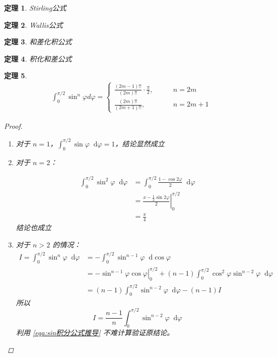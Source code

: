 \documentclass{ctexart}
\numberwithin{equation}{section}    %
\newcommand*{\dif}{\mathop{}\!\mathrm{d}}
\newtheorem{theorem}{定理}
\begin{document}
\begin{theorem}{Stirling公式}
    
\end{theorem}
\begin{theorem}{Wallis公式}
    
\end{theorem}
\begin{theorem}{和差化积公式}
    
\end{theorem}
\begin{theorem}{积化和差公式}
    
\end{theorem}
\begin{theorem}
    \begin{equation}
        \label{eqa:sin积分公式}
        \begin{aligned}
        \int_0^{\pi/2}\sin^n\varphi d\varphi=\left\{ \begin{aligned}
            \frac{(2m-1)!!}{(2m)!!}\cdot\frac{\pi}{2},\qquad&n=2m\\
            \frac{(2m)!!}{(2m+1)!!},\qquad\phantom{\cdot\frac{\pi}{2}}&n=2m+1\end{aligned}\right.
        \end{aligned}
    \end{equation}
\begin{proof}
\begin{enumerate}
\item 对于 $n=1$，$\int_0^{\pi/2}\sin \varphi\dif \varphi=1$，结论显然成立

\item 对于 $n=2$：

\begin{equation}
    \begin{aligned}
        \int_0^{\pi/2}\sin^2\varphi\dif\varphi&=\int_0^{\pi/2}\frac{1-\cos2\varphi}{2}\dif\varphi\\
        &=\left.\frac{x-\frac{1}{2}\sin2\varphi}{2}\right|_0^{\pi/2}\\
        &=\frac{\pi}{4}
    \end{aligned}
\end{equation}
结论也成立

\item 对于 $n>2$ 的情况：
\begin{equation}
    \begin{aligned}
        I = \int_0^{\pi/2}\sin^n\varphi\dif\varphi&=-\int_0^{\pi/2}\sin^{n-1}\varphi\dif\cos\varphi\\
        &=\left.-\sin^{n-1}\varphi\cos\varphi\right|_0^{\pi/2}+(n-1)\int_0^{\pi/2}\cos^2\varphi\sin^{n-2}\varphi\dif\varphi\\
        &=(n-1)\int_0^{\pi/2}\sin^{n-2}\varphi\dif\varphi-(n-1)I
    \end{aligned}
\end{equation}
所以
\begin{equation}
    \label{eqa:sin积分公式推导}
    I=\frac{n-1}{n}\int_0^{\pi/2}\sin^{n-2}\varphi\dif\varphi
\end{equation}
利用 \eqref{eqa:sin积分公式推导} 不难计算验证原结论。
\end{enumerate}


\end{proof}
\end{theorem}
\end{document}
